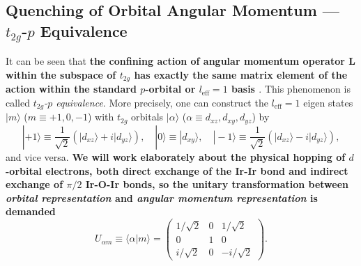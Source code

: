 \documentclass[10pt,nofootinbib]{revtex4}
\begin{document}
	\subsection{Quenching of Orbital Angular Momentum --- $t_{2g}$-$p$ Equivalence}

		It can be seen that \textbf{\color{red}the confining action of angular momentum operator $\bm{L}$ within the subspace of $t_{2g}$ has exactly the same matrix element of the action within the standard $p$-orbital or $l_{\text{eff}}=1$ basis \cite{patrik1999lecture}}. This phenomenon is called \emph{$t_{2g}$-$p$ equivalence}. More precisely, one can construct the $l_{\text{eff}}=1$ eigen states $|m\rangle$ ($m\equiv +1,0,-1$) with $t_{2g}$ orbitals $|\alpha\rangle$ ($\alpha\equiv d_{xz}, d_{xy}, d_{yz}$) by
		\begin{equation}
			|+1\rangle\equiv\dfrac{1}{\sqrt{2}}(|d_{xz}\rangle+i|d_{yz}\rangle),\quad|0\rangle\equiv|d_{xy}\rangle,\quad|-1\rangle\equiv\dfrac{1}{\sqrt{2}}(|d_{xz}\rangle-i|d_{yz}\rangle),
		\end{equation}
		and vice versa.	\textbf{We will work elaborately about the physical hopping of $d$-orbital electrons, both direct exchange of the Ir-Ir bond and indirect exchange of $\pi/2$ Ir-O-Ir bonds, so the unitary transformation between \emph{orbital representation} and \emph{angular momentum representation} is demanded}
		\begin{equation}\label{1.2.1}
			U_{\alpha m}\equiv\langle \alpha|m\rangle=\left(\begin{array}{ccc}
				1/\sqrt{2} & 0 & 1/\sqrt{2} \\
				0 & 1 & 0\\
				i/\sqrt{2} & 0 & -i/\sqrt{2}
			\end{array}\right).
		\end{equation}
\end{document}
